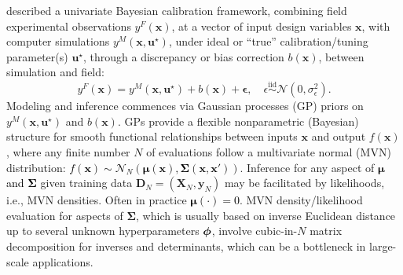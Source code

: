 \documentclass[12pt]{article}
\newcommand{\blunew}[1]{\textcolor{black}{#1}} %
\newcommand{\bm}[1]{\mbox{\boldmath $#1$}}
\begin{document}
\citet{Kennedy:O'Hagan:2001} described a univariate Bayesian calibration
framework, combining field experimental observations $y^F(\mathbf{x})$, at a
vector of input design variables $\mathbf{x}$, with computer simulations
$y^M(\mathbf{x}, \mathbf{u}^\star)$, under ideal or ``true'' calibration/tuning
parameter(s) $\mathbf{u}^\star$, through a discrepancy or bias correction
$b(\mathbf{x})$, between simulation and field:
\begin{equation}
y^F(\mathbf{x}) = y^M(\mathbf{x}, \mathbf{u}^\star) + b(\mathbf{x}) +\mathbf{\epsilon},
\quad \epsilon\stackrel{\mathrm{iid}}{\sim} \mathcal N(0,
\sigma^2_\epsilon).
 \label{eq:koh}
\end{equation}
Modeling and inference commences via Gaussian processes (GP) priors on
$y^M(\mathbf{x}, \mathbf{u}^\star)$ and  $b(\mathbf{x})$. GPs provide a flexible
nonparametric (Bayesian) structure for smooth functional relationships between
inputs $\mathbf{x}$ and output $f(\mathbf{x})$, where any finite number $N$ of
evaluations follow a multivariate normal (MVN) distribution:\blunew{
$f(\mathbf{x}) \sim
\mathcal{N}_N ( \mathbf{\mu}(\mathbf{x}), \mathbf{\Sigma}(\mathbf{x},\mathbf{x}'))$}. Inference
for any aspect of \blunew{$\mathbf{\mu}$ and $\mathbf{\Sigma}$} given training data $\mathbf{D}_N =
(\mathbf{X}_N,\mathbf{y}_N)$ may be facilitated by likelihoods, i.e., MVN
densities.  Often in practice \blunew{$\mathbf{\mu}(\cdot)=0$}.
%
%
MVN density/likelihood evaluation for aspects of $\mathbf{\Sigma}$, which is usually
based on inverse Euclidean distance up to several unknown hyperparameters
$\bm{\phi}$, involve cubic-in-$N$ matrix decomposition for inverses and
determinants, which can be a bottleneck in large-scale applications.
\end{document}

